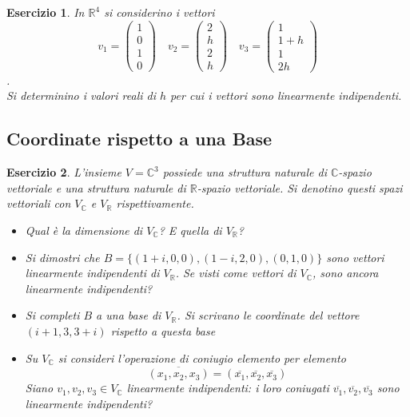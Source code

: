 \documentclass{article}
\newtheorem{es}{Esercizio}
\begin{document}
{\begin{es}
    In $\mathbb{R}^4$ si considerino i vettori
$$v_1=\begin{pmatrix}1\\0\\1\\0\end{pmatrix} \quad
v_2=\begin{pmatrix}2\\h\\2\\h\end{pmatrix} \quad
v_3=\begin{pmatrix}1\\1+h\\1\\2h\end{pmatrix}$$.\\
Si determinino i valori reali di $h$ per cui i vettori sono linearmente indipendenti.
\end{es}




\subsection{Coordinate rispetto a una Base}


\begin{es}
    L'insieme $V=\mathbb{C}^3$ possiede una struttura naturale di $\mathbb{C}$-spazio vettoriale e una struttura naturale di $\mathbb{R}$-spazio vettoriale. Si denotino questi spazi vettoriali con $V_\mathbb{C}$ e $V_\mathbb{R}$ rispettivamente.
    \begin{itemize}
        \item Qual è la dimensione di $V_\mathbb{C}$? E quella di $V_\mathbb{R}$? 
        \item Si dimostri che $B=\{(1+i, 0, 0), (1-i, 2, 0), (0,1,0) \}$ sono vettori linearmente indipendenti di $V_\mathbb{R}$. Se visti come vettori di $V_\mathbb{C}$, sono ancora linearmente indipendenti?
        \item Si completi $B$ a una base di $V_\mathbb{R}$. Si scrivano le coordinate del vettore $(i+1, 3, 3+i)$ rispetto a questa base
        \item Su $V_\mathbb{C}$ si consideri l'operazione di coniugio elemento per elemento $$\overline{(x_1,x_2,x_3)}=(\overline{x_1},\overline{x_2},\overline{x_3})$$
        Siano $v_1,v_2,v_3\in V_\mathbb{C}$ linearmente indipendenti:  i loro coniugati $\overline{v_1},\overline{v_2},\overline{v_3}$ sono linearmente indipendenti?
    \end{itemize}
\end{es}


}
\end{document}
